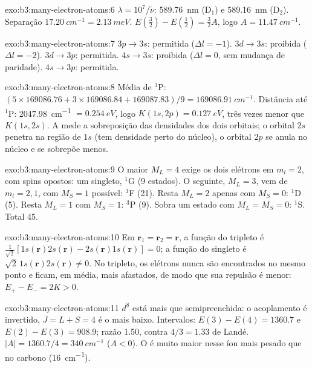 \begin{solution}{exo:b3:many-electron-atoms:6}
$\lambda = 10^7/\tilde\nu$: \qty{589.76}{nm} (D$_1$) e \qty{589.16}{nm}
(D$_2$). Separação $\qty{17.20}{cm^{-1}} = \qty{2.13}{meV}$. $E(\frac32) -
E(\frac12) = \frac32A$, logo $A = \qty{11.47}{cm^{-1}}$.
\end{solution}

\begin{solution}{exo:b3:many-electron-atoms:7}
$3p \to 3s$: permitida ($\Delta l = -1$). $3d \to 3s$: proibida ($\Delta l = -2$).
$3d \to 3p$: permitida. $4s \to 3s$: proibida ($\Delta l = 0$, sem mudança de
paridade). $4s \to 3p$: permitida.
\end{solution}

\begin{solution}{exo:b3:many-electron-atoms:8}
Média de ${}^3$P: $(5 \times 169086.76 + 3 \times 169086.84 + 169087.83)/9 =
\qty{169086.91}{cm^{-1}}$. Distância até ${}^1$P: \qty{2047.98}{cm^{-1}} $=
\qty{0.254}{eV}$, logo $K(1s,2p) = \qty{0.127}{eV}$, três vezes menor que
$K(1s,2s)$. A  mede a sobreposição das densidades dos dois
orbitais; o orbital $2s$ penetra na região de $1s$ (tem densidade perto do
núcleo), o orbital $2p$ se anula no núcleo e se sobrepõe menos.
\end{solution}

\begin{solution}{exo:b3:many-electron-atoms:9}
O maior $M_L = 4$ exige os dois elétrons em $m_l = 2$, com spins opostos: um
singleto, ${}^1$G (9 estados). O seguinte, $M_L = 3$, vem de $m_l = 2, 1$, com
$M_S = 1$ possível: ${}^3$F (21). Resta $M_L = 2$ apenas com $M_S = 0$:
${}^1$D (5). Resta $M_L = 1$ com $M_S = 1$: ${}^3$P (9). Sobra um estado com
$M_L = M_S = 0$: ${}^1$S. Total 45.
\end{solution}

\begin{solution}{exo:b3:many-electron-atoms:10}
Em $\mathbf r_1 = \mathbf r_2 = \mathbf r$, a função do tripleto é
$\frac{1}{\sqrt2}[1s(\mathbf r)2s(\mathbf r) - 2s(\mathbf r)1s(\mathbf r)] = 0$; a
função do singleto é $\sqrt2\,1s(\mathbf r)2s(\mathbf r) \ne 0$. No tripleto, os
elétrons nunca são encontrados no mesmo ponto e ficam, em média, mais
afastados, de modo que sua repulsão é menor: $E_+ - E_- = 2K > 0$.
\end{solution}

\begin{solution}{exo:b3:many-electron-atoms:11}
$d^8$ está mais que semipreenchida: o acoplamento é invertido, $J = L + S = 4$
é o mais baixo. Intervalos: $E(3) - E(4) = 1360.7$ e $E(2) - E(3) = 908.9$; razão
1.50, contra $4/3 = 1.33$ de Landé. $|A| = 1360.7/4 = \qty{340}{cm^{-1}}$
($A < 0$). O  é muito maior nesse íon mais pesado que
no carbono (\qty{16}{cm^{-1}}).
\end{solution}

